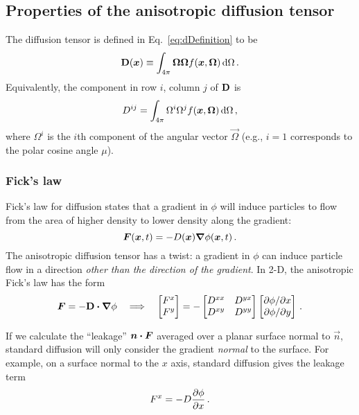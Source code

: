 \subsection{Properties of the anisotropic diffusion tensor}
The diffusion tensor is defined in Eq.~\eqref{eq:dDefinition} to be
\begin{equation*}
  \mathbf{D}(\bm{x}) \equiv \int_{4\pi} \bm{\Omega} \bm{\Omega}
  f(\bm{x}, \bm{\Omega}) \mathop{}\!\mathrm{d}\Omega \,.
\end{equation*}
Equivalently, the component in row $i$, column $j$ of $\mathbf{D}$ is
\begin{equation}\label{eq:dij}
  D^{ij} = \int_{4\pi} \Omega^i \Omega^j
  f(\bm{x}, \bm{\Omega}) \mathop{}\!\mathrm{d}\Omega \,,
\end{equation}
where $\Omega^i$ is the $i$th component of the angular vector $\vec{\Omega}$
(e.g., $i=1$ corresponds to the polar cosine angle $\mu$).

\subsubsection{Fick's law}
Fick's law for diffusion states that a gradient in $\phi$ will induce particles
to flow from the area of higher density to lower density along the gradient:
\begin{equation*}
  \bm{F}(\bm{x},t) = - D(\bm{x}) \bm{\nabla} \phi(\bm{x},t)\,.
\end{equation*}
The anisotropic diffusion tensor has a twist: a gradient in $\phi$ can induce
particle flow in a direction \emph{other than the direction of the gradient}. In
2-D, the anisotropic Fick's law has the form
\begin{equation*}
  \bm{F} = - \mathbf{D} \bm{\cdot} \bm{\nabla} \phi
  \quad \Longrightarrow \quad
  \begin{bmatrix}
    F^x \\
    F^y
  \end{bmatrix}
  =
  -
  \begin{bmatrix}
    D^{xx} & D^{yx} \\
    D^{xy} & D^{yy}
  \end{bmatrix}
  \begin{bmatrix}
    {\partial \phi}/{\partial x} \\
    {\partial \phi}/{\partial y}
  \end{bmatrix} \,.
\end{equation*}

If we calculate the ``leakage'' $\bm{n} \bm{\cdot} \bm{F}$ averaged over a planar
surface normal to $\vec{n}$, standard diffusion will only consider the gradient
\emph{normal} to the surface. For example, on a surface normal to the $x$ axis,
standard diffusion gives the leakage term
\begin{equation*}
  F^x = - D \frac{\partial \phi}{\partial x}\,.
\end{equation*}

